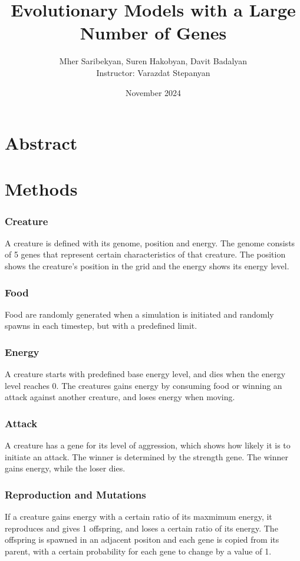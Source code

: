 \documentclass{report}
\title{Evolutionary Models with a Large Number of Genes}
\author{
    Mher Saribekyan, Suren Hakobyan, Davit Badalyan\\
    Instructor: Varazdat Stepanyan 
}
\affil{American University of Armenia}
\date{November 2024}
\begin{document}
\maketitle
\tableofcontents
\section{Abstract}
\section{Methods}
\subsubsection{Creature}
A creature is defined with its genome, position and energy.
The genome consists of 5 genes that represent certain characteristics of that creature.
The position shows the creature's position in the grid and the energy shows its energy level.
\subsubsection{Food}
Food are randomly generated when a simulation is initiated and randomly spawns in each timestep, but with a predefined limit.
\subsubsection{Energy}
A creature starts with predefined base energy level, and dies when the energy level reaches 0.
The creatures gains energy by consuming food or winning an attack against another creature, and loses energy when moving.
\subsubsection{Attack}
A creature has a gene for its level of aggression, which shows how likely it is to initiate an attack.
The winner is determined by the strength gene. The winner gains energy, while the loser dies.
\subsubsection{Reproduction and Mutations}
If a creature gains energy with a certain ratio of its maxmimum energy, it reproduces and gives 1 offspring, and loses a certain ratio of its energy.
The offspring is spawned in an adjacent positon and each gene is copied from its parent, with a certain probability for each gene to change by a value of 1.
\end{document}
